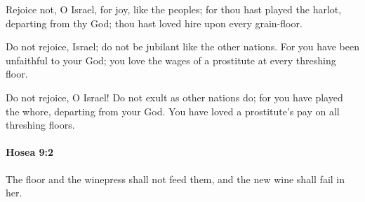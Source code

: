 			\begin{versebox}
					\item[BHS] 
					\item[LXX] 
					\item[ASV] Rejoice not, O Israel, for joy, like the peoples; for thou hast played the harlot, departing from thy God; thou hast loved hire upon every grain-floor.
					\item[NIV] Do not rejoice, Israel; do not be jubilant like the other nations. For you have been unfaithful to your God; you love the wages of a prostitute at every threshing floor.
					\item[NRSV] Do not rejoice, O Israel! Do not exult as other nations do; for you have played the whore, departing from your God. You have loved a prostitute’s pay on all threshing floors.
			\end{versebox}

		\paragraph{Hosea 9:2} %
			\label{HOSEA-9-2}

			The floor and the winepress shall not feed them, and the new wine shall fail in her.

